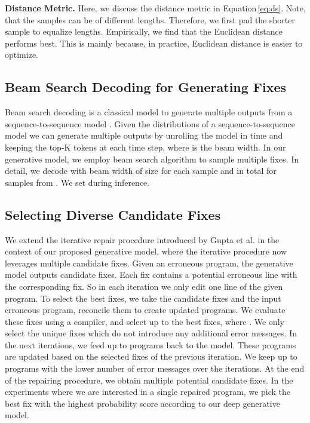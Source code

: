 \documentclass[runningheads]{llncs}
\newcommand{\equref}{Equation}
\newcommand{\myparagraph}[1]{\vspace{0.0em}\noindent\textbf{#1.}}
\begin{document}
\myparagraph{Distance Metric}
\label{para:metric}
Here, we discuss the distance metric  in \equref \,\ref{eq:ds}. Note, that the samples  can be of different lengths. Therefore, we first pad the shorter sample to equalize lengths. Empirically, we find that the Euclidean distance performs best. This is mainly because, in practice, Euclidean distance is easier to optimize.

\subsection{Beam Search Decoding for Generating Fixes}
Beam search decoding is a classical model to generate multiple outputs from a sequence-to-sequence model \cite{diverse_accurate,deshpande2019fast}. Given the distributions  of a sequence-to-sequence model we can generate multiple outputs by unrolling the model in time and keeping the top-K tokens at each time step, where  is the beam width. In our generative model, we employ beam search algorithm to sample multiple fixes. In detail,  we decode with beam width of size  for each sample  and in total for  samples from . We set  during inference.

\subsection{Selecting Diverse Candidate Fixes}
\label{subsec:selecting}

We extend the iterative repair procedure introduced by Gupta et al. \cite{Gupta2017DeepFixFC} in the context of our proposed generative model, where the iterative procedure now leverages multiple candidate fixes.
Given an erroneous program, the generative model outputs  candidate fixes. Each fix contains a potential erroneous line with the corresponding fix. So in each iteration we only edit one line of the given program. To select the best fixes, we take the candidate fixes and the input erroneous program, reconcile them to create  updated programs. We evaluate these fixes using a compiler, and select up to the best  fixes, where . We only select the unique fixes which do not introduce any additional error messages. In the next iterations, we feed up to  programs back to the model. These programs are updated based on the selected fixes of the previous iteration. We keep up to  programs with the lower number of error messages over the iterations. At the end of the repairing procedure, we obtain multiple potential candidate fixes. In the experiments where we are interested in a single repaired program, we pick the best fix with the highest probability score according to our deep generative model.
\end{document}
